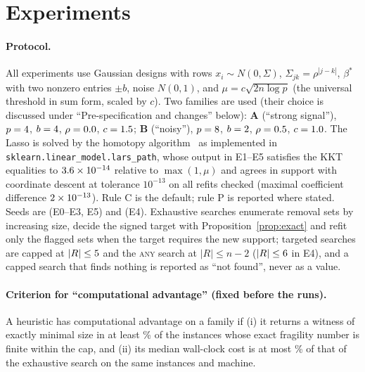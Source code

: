 \documentclass[10pt,a4paper]{article}
\theoremstyle{plain}
\theoremstyle{definition}
\theoremstyle{remark}
\newcommand{\tsc}[1]{\textnormal{\textsc{#1}}}  %
\begin{document}
\section{Experiments}\label{sec:experiments}

\paragraph{Protocol.} All experiments use Gaussian designs with rows $x_i\sim N(0,\Sigma)$, $\Sigma_{jk}=\rho^{|j-k|}$, $\beta^\ast$ with two nonzero entries $\pm b$, noise $N(0,1)$, and $\mu=c\sqrt{2n\log p}$ (the universal threshold in sum form, scaled by $c$). Two families are used (their choice is discussed under ``Pre-specification and changes'' below): \textbf{A} (``strong signal''), $p=4$, $b=4$, $\rho=0.0$, $c=1.5$; \textbf{B} (``noisy''), $p=8$, $b=2$, $\rho=0.5$, $c=1.0$. The Lasso is solved by the homotopy algorithm~\citep{efron2004,osborne2000} as implemented in \texttt{sklearn.linear\_model.lars\_path}, whose output in E1--E5 satisfies the KKT equalities to $3.6\times10^{-14}$ relative to $\max(1,\mu)$ and agrees in support with coordinate descent at tolerance $10^{-13}$ on all \EoneCdN{} refits checked (maximal coefficient difference $2\times 10^{-13}$). Rule C is the default; rule P is reported where stated. Seeds are \MetaSeed{} (E0--E3, E5) and \MetaSeedScaling{} (E4). Exhaustive searches enumerate removal sets by increasing size, decide the signed target with Proposition~\ref{prop:exact} and refit only the flagged sets when the target requires the new support; targeted searches are capped at $|R|\le5$ and the \tsc{any} search at $|R|\le n-2$ ($|R|\le6$ in E4), and a capped search that finds nothing is reported as ``not found'', never as a value.

\paragraph{Criterion for ``computational advantage'' (fixed before the runs).} A heuristic has computational advantage on a family if (i) it returns a witness of exactly minimal size in at least \EthreeCritExact\% of the instances whose exact fragility number is finite within the cap, and (ii) its median wall-clock cost is at most \EthreeCritCost\% of that of the exhaustive search on the same instances and machine.
\end{document}
